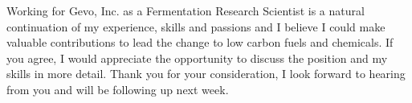 \documentclass[11pt,a4paper,sans]{moderncv}
\begin{document}
\begin{spacing}{1.15}
Working for Gevo, Inc. as a Fermentation Research Scientist is a natural continuation of my experience, skills and passions and I believe I could make valuable contributions to lead the change to low carbon fuels and chemicals. If you agree, I would appreciate the opportunity to discuss the position and my skills in more detail. Thank you for your consideration, I look forward to hearing from you and will be following up next week.

\end{spacing}
\vspace*{2mm} 
\makeletterclosing
\end{document}
